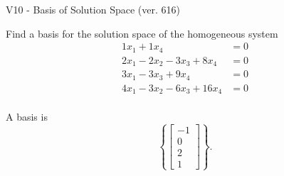\begin{exercise}
  \begin{exerciseTitle}V10 - Basis of Solution Space (ver. 616)\end{exerciseTitle}
  \begin{exerciseStatement}
    Find a basis for the solution space of the homogeneous system 
\begin{align*}
 1 x_ 1 + 1 x_ 4 &= 0  \\ 
  2 x_ 1 -2 x_ 2 -3 x_ 3 + 8 x_ 4 &= 0  \\ 
  3 x_ 1 -3 x_ 3 + 9 x_ 4 &= 0  \\ 
  4 x_ 1 -3 x_ 2 -6 x_ 3 + 16 x_ 4 &= 0  \\ 
 \end{align*}


 
  \end{exerciseStatement}

  \begin{exerciseAnswer}
   A basis is   
\[\left\{\left[\begin{array}{c}
-1 \\
0 \\
2 \\
1
\end{array}\right]\right\}.\]

  


  \end{exerciseAnswer}
\end{exercise}